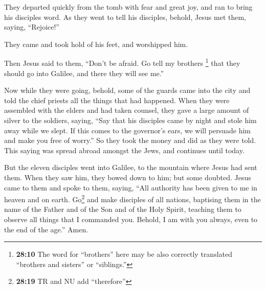  They departed quickly from the tomb with fear and great
joy, and ran to bring his disciples word.  As they went to
tell his disciples, behold, Jesus met them, saying, ``Rejoice!''

They came and took hold of his feet, and worshipped him.

 Then Jesus said to them, ``Don't be afraid. Go tell my
brothers \footnote{\textbf{28:10} The word for ``brothers'' here may be
  also correctly translated ``brothers and sisters'' or ``siblings.''}
that they should go into Galilee, and there they will see me.''

 Now while they were going, behold, some of the guards
came into the city and told the chief priests all the things that had
happened.  When they were assembled with the elders and
had taken counsel, they gave a large amount of silver to the soldiers,
 saying, ``Say that his disciples came by night and stole
him away while we slept.  If this comes to the governor's
ears, we will persuade him and make you free of worry.'' 
So they took the money and did as they were told. This saying was spread
abroad amongst the Jews, and continues until today.

 But the eleven disciples went into Galilee, to the
mountain where Jesus had sent them.  When they saw him,
they bowed down to him; but some doubted.  Jesus came to
them and spoke to them, saying, ``All authority has been given to me in
heaven and on earth.  Go\footnote{\textbf{28:19} TR and
  NU add ``therefore''} and make disciples of all nations, baptising
them in the name of the Father and of the Son and of the Holy Spirit,
 teaching them to observe all things that I commanded
you. Behold, I am with you always, even to the end of the age.'' Amen.
